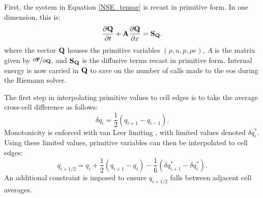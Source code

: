 First, the system in Equation \eqref{NSE_tensor} is recast in primitive form. In one dimension, this is: 
\begin{equation} \label{NSE_primitive}
\dfrac{\partial \vb{Q}}{\partial t} + \vb{A} \dfrac{\partial \vb{Q}}{\partial x} = \vb{S_Q}.
\end{equation}
where the vector $\vb{Q}$ houses the primitive variables $(\rho, u, p, \rho e )$, $A$ is the matrix given by $\nicefrac{\partial \vb{F}}{\partial \vb{Q}}$, and $\vb{S_Q}$ is the diffusive terms recast in primitive form. Internal energy is now carried in $\vb{Q}$ to save on the number of calls made to the \gls{eos} during the Riemann solver. 

The first step in interpolating primitive values to cell edges is to take the average cross-cell difference as follows:
\begin{equation}
\delta q_i = \dfrac{1}{2}\left( q_{i+1} - q_{i-1} \right).
\end{equation}
Monotonicity is enforced with van Leer limiting \cite{VANLEER1979101}, with limited values denoted $\delta q_i^*$. Using these limited values, primitive variables can then be interpolated to cell edges:
\begin{equation}
q_{i+1/2} = q_i + \dfrac{1}{2} \left( q_{i+1} - q_i \right) - \dfrac{1}{6} \left( \delta q_{i+1}^* - \delta q_i^* \right).
\end{equation}
An additional constraint is imposed to ensure $q_{i+1/2}$ falls between adjacent cell averages. 

